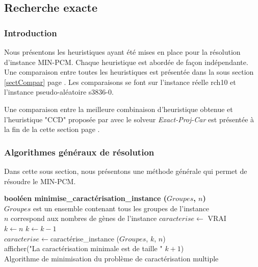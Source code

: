 \subsection{Recherche exacte}
\label{rechercheExacte}
\subsubsection{Introduction}
Nous présentons les heuristiques ayant été mises en place pour la résolution d'instance MIN-PCM. Chaque heuristique est abordée de façon indépendante. Une comparaison entre toutes les heuristiques est présentée dans la sous section \ref{sectCompar} page \pageref{sectCompar}. Les comparaisons se font sur l'instance réelle rch10 et l'instance pseudo-aléatoire s3836-0.

Une comparaison entre la meilleure combinaison d'heuristique obtenue et l'heuristique "CCD" proposée par \cite{Chhel2013} avec le solveur \textit{Exact-Proj-Car} est présentée à la fin de la cette section page \pageref{sectionCompare}.
\subsubsection{Algorithmes généraux de résolution}

Dans cette sous section, nous présentons une méthode générale qui permet de résoudre le MIN-PCM.

\begin{algorithm}
	\textbf{booléen minimise\_caractérisation\_instance ($Groupes$, $n$)}\\
	\tcp
	{
		$Groupes$ est un ensemble contenant tous les groupes de l'instance\\
		$n$ correspond aux nombres de gènes de l'instance
	}
	$caracterise \leftarrow$ VRAI\\
	$k \leftarrow n$ 
	{
		$k \leftarrow k-1$\\
		$caracterise \leftarrow $caractérise\_instance ($Groupes$, $k$, $n$)\\
	}
	afficher("La caractérisation minimale est de taille " $k+1$)\\
	\caption{Algorithme de minimisation du problème de caractérisation multiple}
	\label{algoMinPCM}
\end{algorithm}

